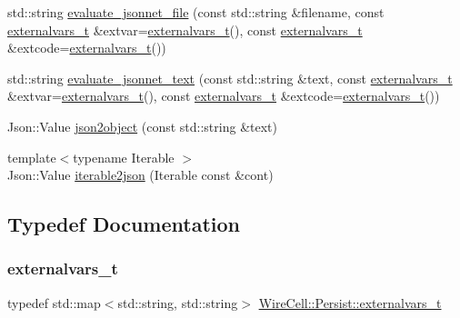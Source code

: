 \begin{DoxyCompactItemize}
\item 
std\+::string \hyperlink{namespace_wire_cell_1_1_persist_ab70e06414625bf66f10b20dd41112697}{evaluate\+\_\+jsonnet\+\_\+file} (const std\+::string \&filename, const \hyperlink{namespace_wire_cell_1_1_persist_ae031fc57de5b5814ccd700d007bc847b}{externalvars\+\_\+t} \&extvar=\hyperlink{namespace_wire_cell_1_1_persist_ae031fc57de5b5814ccd700d007bc847b}{externalvars\+\_\+t}(), const \hyperlink{namespace_wire_cell_1_1_persist_ae031fc57de5b5814ccd700d007bc847b}{externalvars\+\_\+t} \&extcode=\hyperlink{namespace_wire_cell_1_1_persist_ae031fc57de5b5814ccd700d007bc847b}{externalvars\+\_\+t}())
\item 
std\+::string \hyperlink{namespace_wire_cell_1_1_persist_ab593a212dbed0b2185fe5fe70b29fc68}{evaluate\+\_\+jsonnet\+\_\+text} (const std\+::string \&text, const \hyperlink{namespace_wire_cell_1_1_persist_ae031fc57de5b5814ccd700d007bc847b}{externalvars\+\_\+t} \&extvar=\hyperlink{namespace_wire_cell_1_1_persist_ae031fc57de5b5814ccd700d007bc847b}{externalvars\+\_\+t}(), const \hyperlink{namespace_wire_cell_1_1_persist_ae031fc57de5b5814ccd700d007bc847b}{externalvars\+\_\+t} \&extcode=\hyperlink{namespace_wire_cell_1_1_persist_ae031fc57de5b5814ccd700d007bc847b}{externalvars\+\_\+t}())
\item 
Json\+::\+Value \hyperlink{namespace_wire_cell_1_1_persist_a25359fd9189802ba07dce1de7e450315}{json2object} (const std\+::string \&text)
\item 
{\footnotesize template$<$typename Iterable $>$ }\\Json\+::\+Value \hyperlink{namespace_wire_cell_1_1_persist_a5a19d242eec54e2353002379147473ad}{iterable2json} (Iterable const \&cont)
\end{DoxyCompactItemize}


\subsection{Typedef Documentation}
\mbox{\label{namespace_wire_cell_1_1_persist_ae031fc57de5b5814ccd700d007bc847b}} 
\subsubsection{\texorpdfstring{externalvars\+\_\+t}{externalvars\_t}}
{\footnotesize\ttfamily typedef std\+::map$<$std\+::string, std\+::string$>$ \hyperlink{namespace_wire_cell_1_1_persist_ae031fc57de5b5814ccd700d007bc847b}{Wire\+Cell\+::\+Persist\+::externalvars\+\_\+t}}

